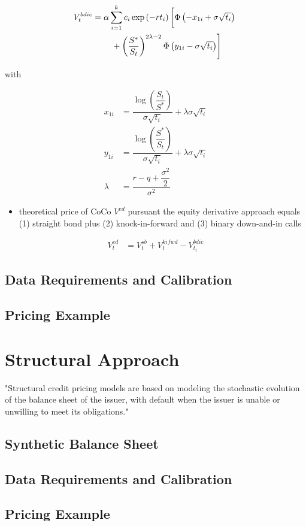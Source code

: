 \begin{align}
    V_t^{bdic} &= \alpha \sum^k_{i=1} c_i \exp\left(-r t_i\right) \left[ \Phi\left(-x_{1i} + \sigma \sqrt{t_i}\right)\vphantom{\dfrac{S^*}{S}}\right.\nonumber\\
   &\qquad \left.\vphantom{\dfrac{S^*}{S_t}} +\left(\dfrac{S^*}{S_t}\right)^{2\lambda -2} \Phi\left(y_{1i} - \sigma \sqrt{t_i}\right) \right]
\end{align}

with 

\begin{align*}
x_{1i} &= \dfrac{\log \left( \dfrac{S_t}{S^*} \right)}{\sigma \sqrt{t_i}} + \lambda \sigma \sqrt{t_i}\\
y_{1i} &= \dfrac{\log \left( \dfrac{S^*}{S_t} \right)}{\sigma \sqrt{t_i}} + \lambda \sigma \sqrt{t_i}\\
\lambda &= \dfrac{r-q+\dfrac{\sigma^2}{2}}{\sigma^2}
\end{align*}

\begin{itemize}
\item theoretical price of CoCo $V^{ed}$ pursuant the equity derivative approach equals (1) straight bond plus (2) knock-in-forward and (3) binary down-and-in calls
\end{itemize}

\begin{align}
    V^{ed}_t &= V^{sb}_t + V_t^{kifwd} - V_{t_i}^{bdic} 
\end{align}

\subsection{Data Requirements and Calibration}

\subsection{Pricing Example}

\section{Structural Approach}

"Structural credit pricing models are based on modeling the stochastic evolution of the balance sheet of the issuer, with default when the issuer is unable or unwilling to meet its obligations." \citep{duffie2003credit}

\subsection{Synthetic Balance Sheet}

\subsection{Data Requirements and Calibration}

\subsection{Pricing Example}



